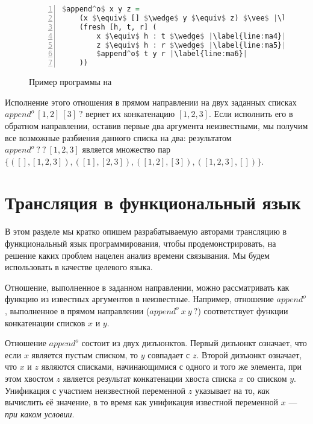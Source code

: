 \documentclass[conference,american,russian]{IEEEtran}
\begin{document}
\begin{figure}[h!]
  \begin{center}
  \begin{minipage}{0.3\textwidth}
  \begin{lstlisting}[language=Haskell, frame=single, numbers=left,numberstyle=\small, escapechar=|]
  $append^o$ x y z =
    (x $\equiv$ [] $\wedge$ y $\equiv$ z) $\vee$ |\label{line:ma2}|
    (fresh [h, t, r] (
        x $\equiv$ h : t $\wedge$ |\label{line:ma4}|
        z $\equiv$ h : r $\wedge$ |\label{line:ma5}|
        $append^o$ t y r |\label{line:ma6}|
    ))
    \end{lstlisting}
  \end{minipage}
  \end{center}
  \caption{Пример программы на \miniKanren{}}
  \label{lst:appendoDEF}
\end{figure}

Исполнение этого отношения в прямом направлении на двух заданных списках $append^o \ [1,2] \ [3] \ ?$ вернет их конкатенацию $[1,2,3]$.
Если исполнить его в обратном направлении, оставив первые два аргумента неизвестными, мы получим все возможные разбиения данного списка на два: результатом $append^o \ ? \ ? \ [1,2,3]$ является множество пар $\{([],[1,2,3]), ([1], [2,3]), ([1,2], [3]), ([1,2,3], [])\}$.

\section{Трансляция в функциональный язык}\label{translator}

В этом разделе мы кратко опишем разрабатываемую авторами трансляцию \miniKanren{} в функциональный язык программирования, чтобы продемонстрировать, на решение каких проблем нацелен анализ времени связывания.
Мы будем использовать \haskell{} в качестве целевого языка. 

Отношение, выполненное в заданном направлении, можно рассматривать как функцию из известных аргументов в неизвестные. 
Например, отношение $append^o$, выполненное в прямом направлении ($append^o \ x \ y \ ?$) соответствует функции конкатенации списков $x$ и $y$. 

Отношение $append^o$ состоит из двух дизъюнктов. 
Первый дизъюнкт означает, что если $x$ является пустым списком, то $y$ совпадает с $z$. 
Второй дизъюнкт означает, что $x$ и $z$ являются списками, начинающимися с одного и того же элемента, при этом хвостом $z$ является результат конкатенации хвоста списка $x$ со списком $y$. 
Унификация с участием неизвестной переменной $z$ указывает на то, \emph{как} вычислить её значение, в то время как унификация  известной переменной $x$ --- \emph{при каком условии}.
\end{document}
